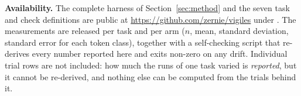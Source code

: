 \textbf{Availability.} The complete harness of Section~\ref{sec:method} and the seven task and check
definitions are public at \url{https://github.com/zernie/vigiles} under . The
measurements are released per task and per arm ($n$, mean, standard deviation, standard error for
each token class), together with a self-checking script that re-derives every number reported here
and exits non-zero on any drift. Individual trial rows are not included: how much the runs of one task
varied is \emph{reported}, but it cannot be re-derived, and nothing else can be computed from the
trials behind it.




\balance


